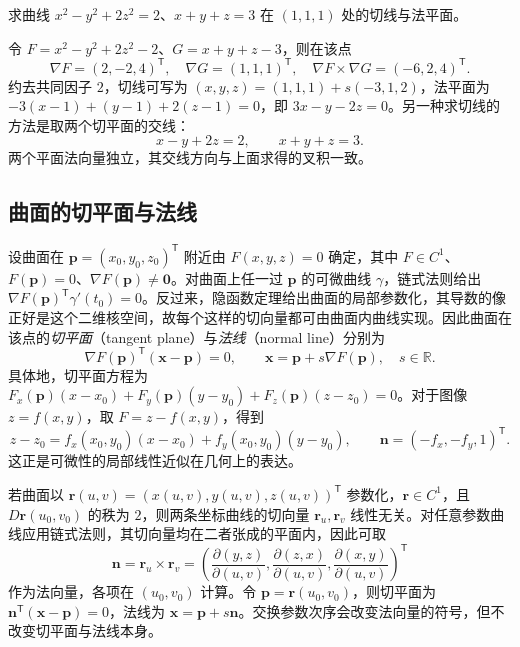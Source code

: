 \begin{example}
\label{ex:implicit-space-curve-tangent-ch14}
求曲线 $x^2-y^2+2z^2=2$、$x+y+z=3$ 在 $(1,1,1)$ 处的切线与法平面。
\end{example}
\begin{solve}
令 $F=x^2-y^2+2z^2-2$、$G=x+y+z-3$，则在该点
\[
    \nabla F=(2,-2,4)^{\mathsf T},\quad
    \nabla G=(1,1,1)^{\mathsf T},\quad
    \nabla F\times\nabla G=(-6,2,4)^{\mathsf T}.
\]
约去共同因子 $2$，切线可写为 $(x,y,z)=(1,1,1)+s(-3,1,2)$，法平面为 $-3(x-1)+(y-1)+2(z-1)=0$，即 $3x-y-2z=0$。另一种求切线的方法是取两个切平面的交线：
\[
    x-y+2z=2,\qquad x+y+z=3.
\]
两个平面法向量独立，其交线方向与上面求得的叉积一致。
\end{solve}

\subsection{曲面的切平面与法线}
\label{subsec:tangent-planes-and-normal-lines-of-surfaces}

设曲面在 $\boldsymbol p=(x_0,y_0,z_0)^{\mathsf T}$ 附近由 $F(x,y,z)=0$ 确定，其中 $F\in C^1$、$F(\boldsymbol p)=0$、$\nabla F(\boldsymbol p)\ne\boldsymbol0$。对曲面上任一过 $\boldsymbol p$ 的可微曲线 $\gamma$，链式法则给出 $\nabla F(\boldsymbol p)^{\mathsf T}\gamma'(t_0)=0$。反过来，隐函数定理给出曲面的局部参数化，其导数的像正好是这个二维核空间，故每个这样的切向量都可由曲面内曲线实现。因此曲面在该点的\emph{切平面}（tangent plane）与\emph{法线}（normal line）分别为
\begin{equation}
\label{eq:implicit-surface-tangent-normal-ch14}
    \nabla F(\boldsymbol p)^{\mathsf T}(\boldsymbol x-\boldsymbol p)=0,
    \qquad \boldsymbol x=\boldsymbol p+s\nabla F(\boldsymbol p),\quad s\in\mathbb R.
\end{equation}
具体地，切平面方程为 $F_x(\boldsymbol p)(x-x_0)+F_y(\boldsymbol p)(y-y_0)+F_z(\boldsymbol p)(z-z_0)=0$。对于图像 $z=f(x,y)$，取 $F=z-f(x,y)$，得到
\[
    z-z_0=f_x(x_0,y_0)(x-x_0)+f_y(x_0,y_0)(y-y_0),\qquad
    \boldsymbol n=(-f_x,-f_y,1)^{\mathsf T}.
\]
这正是可微性的局部线性近似在几何上的表达。

若曲面以 $\boldsymbol r(u,v)=(x(u,v),y(u,v),z(u,v))^{\mathsf T}$ 参数化，$\boldsymbol r\in C^1$，且 $D\boldsymbol r(u_0,v_0)$ 的秩为 $2$，则两条坐标曲线的切向量 $\boldsymbol r_u,\boldsymbol r_v$ 线性无关。对任意参数曲线应用链式法则，其切向量均在二者张成的平面内，因此可取
\begin{equation}
\label{eq:parametric-surface-normal-ch14}
    \boldsymbol n=\boldsymbol r_u\times\boldsymbol r_v
       =\left(\frac{\partial(y,z)}{\partial(u,v)},
              \frac{\partial(z,x)}{\partial(u,v)},
              \frac{\partial(x,y)}{\partial(u,v)}\right)^{\mathsf T}
\end{equation}
作为法向量，各项在 $(u_0,v_0)$ 计算。令 $\boldsymbol p=\boldsymbol r(u_0,v_0)$，则切平面为 $\boldsymbol n^{\mathsf T}(\boldsymbol x-\boldsymbol p)=0$，法线为 $\boldsymbol x=\boldsymbol p+s\boldsymbol n$。交换参数次序会改变法向量的符号，但不改变切平面与法线本身。

